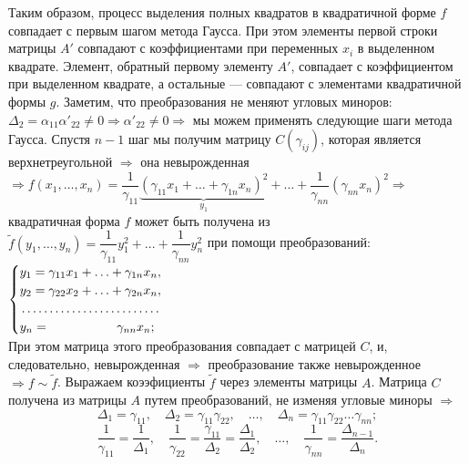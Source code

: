 \begin{Proof}
	Таким образом, процесс выделения полных квадратов в квадратичной форме $f$ совпадает с первым шагом метода Гаусса. При этом элементы первой строки матрицы $A'$ совпадают с коэффициентами при переменных $x_i$ в выделенном квадрате. Элемент, обратный первому элементу $A'$, совпадает с коэффициентом при выделенном квадрате, а остальные --- совпадают с элементами квадратичной формы $g$. Заметим, что преобразования не меняют угловых миноров: $\Delta_2 = \alpha_{11}\alpha'_{22}\ne 0\Rightarrow \alpha'_{22}\ne 0\Rightarrow$ мы можем применять следующие шаги метода Гаусса. Спустя $n-1$ шаг мы получим матрицу $C (\gamma_{ij})$, которая является верхнетреугольной $\Rightarrow$ она невырожденная $\Rightarrow f(x_1,\ldots,x_n) = \dfrac{1}{\gamma_{11}}\underbrace{(\gamma_{11}x_1 + \ldots+\gamma_{1n}x_n)^2}_{y_1} + \ldots + \dfrac{1}{\gamma_{nn}}(\gamma_{nn}x_n)^2\Rightarrow$ квадратичная форма $f$ может быть получена из $\widetilde{f}(y_1,\ldots,y_n) = \dfrac{1}{\gamma_{11}}y_1^2+...+\dfrac{1}{\gamma_{nn}}y_n^2$ при помощи  преобразований: $\begin{cases} y_1 = \gamma_{11}x_1 + \ldots + \gamma_{1n}x_n,\\
		y_2 = \gamma_{22}x_2 + \ldots + \gamma_{2n}x_n,\\
		\dotfill\\
		y_n = \qquad\qquad\quad\;\gamma_{nn}x_n;
	\end{cases}$\\
	При этом матрица этого преобразования совпадает с матрицей $C$, и, следовательно, невырожденная $\Rightarrow$ преобразование также невырожденное $\Rightarrow f\sim \widetilde{f}$. Выражаем коээфициенты $\widetilde{f}$ через элементы матрицы $A$. Матрица $C$ получена из матрицы $A$ путем преобразований, не изменяя угловые миноры $\Rightarrow$\\	
	$$\Delta_1 = \gamma_{11},\quad \Delta_2 = \gamma_{11}\gamma_{22},\quad \dots,\quad \Delta_n = \gamma_{11}\gamma_{22}\dots\gamma_{nn};$$
	$$\dfrac{1}{\gamma_{11}}=\dfrac{1}{\Delta_1}, \quad\dfrac{1}{\gamma_{22}}=\dfrac{\gamma_{11}}{\Delta_2} = \dfrac{\Delta_1}{\Delta_2},\quad  \dots,\quad \dfrac{1}{\gamma_{nn}} = \dfrac{\Delta_{n-1}}{\Delta_n}.$$
\end{Proof}  













